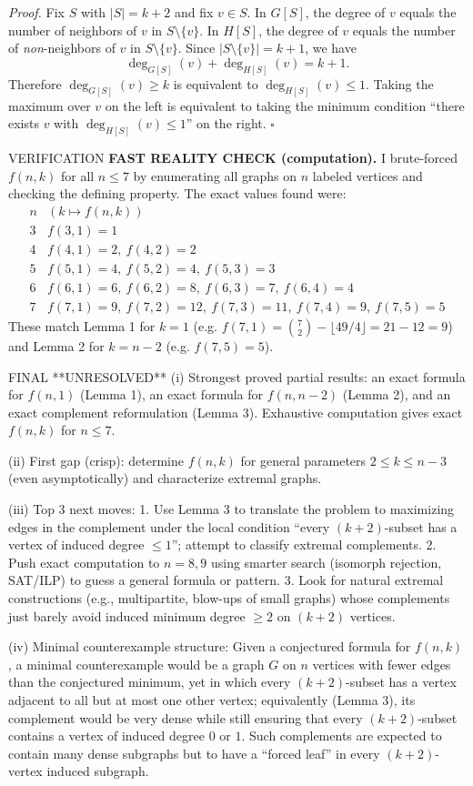 \emph{Proof.}
Fix $S$ with $|S|=k+2$ and fix $v\in S$.
In $G[S]$, the degree of $v$ equals the number of neighbors of $v$ in $S\setminus\{v\}$.
In $H[S]$, the degree of $v$ equals the number of \emph{non}-neighbors of $v$ in
$S\setminus\{v\}$.
Since $|S\setminus\{v\}|=k+1$, we have
\[
\deg_{G[S]}(v) + \deg_{H[S]}(v) = k+1.
\]
Therefore $\deg_{G[S]}(v)\ge k$ is equivalent to $\deg_{H[S]}(v)\le 1$.
Taking the maximum over $v$ on the left is equivalent to taking the minimum
condition ``there exists $v$ with $\deg_{H[S]}(v)\le 1$'' on the right.
\hfill $\square$

VERIFICATION
\textbf{FAST REALITY CHECK (computation).}
I brute-forced $f(n,k)$ for all $n\le7$ by enumerating all graphs on $n$ labeled
vertices and checking the defining property.
The exact values found were:
\[
\begin{array}{c|l}
 n & (k\mapsto f(n,k))\\\hline
3 & f(3,1)=1\\
4 & f(4,1)=2,\ f(4,2)=2\\
5 & f(5,1)=4,\ f(5,2)=4,\ f(5,3)=3\\
6 & f(6,1)=6,\ f(6,2)=8,\ f(6,3)=7,\ f(6,4)=4\\
7 & f(7,1)=9,\ f(7,2)=12,\ f(7,3)=11,\ f(7,4)=9,\ f(7,5)=5
\end{array}
\]
These match Lemma 1 for $k=1$ (e.g. $f(7,1)=\binom72-\lfloor 49/4\rfloor=21-12=9$)
and Lemma 2 for $k=n-2$ (e.g. $f(7,5)=5$).

FINAL
**UNRESOLVED**
(i) Strongest proved partial results: an exact formula for $f(n,1)$ (Lemma 1),
an exact formula for $f(n,n-2)$ (Lemma 2), and an exact complement reformulation
(Lemma 3). Exhaustive computation gives exact $f(n,k)$ for $n\le7$.

(ii) First gap (crisp): determine $f(n,k)$ for general parameters
$2\le k\le n-3$ (even asymptotically) and characterize extremal graphs.

(iii) Top 3 next moves:
1. Use Lemma 3 to translate the problem to maximizing edges in the complement
under the local condition ``every $(k+2)$-subset has a vertex of induced degree
$\le1$''; attempt to classify extremal complements.
2. Push exact computation to $n=8,9$ using smarter search (isomorph rejection,
SAT/ILP) to guess a general formula or pattern.
3. Look for natural extremal constructions (e.g., multipartite, blow-ups of
small graphs) whose complements just barely avoid induced minimum degree $\ge2$
on $(k+2)$ vertices.

(iv) Minimal counterexample structure:
Given a conjectured formula for $f(n,k)$, a minimal counterexample would be a
graph $G$ on $n$ vertices with fewer edges than the conjectured minimum, yet in
which every $(k+2)$-subset has a vertex adjacent to all but at most one other
vertex; equivalently (Lemma 3), its complement would be very dense while still
ensuring that every $(k+2)$-subset contains a vertex of induced degree $0$ or $1$.
Such complements are expected to contain many dense subgraphs but to have a
``forced leaf'' in every $(k+2)$-vertex induced subgraph.



